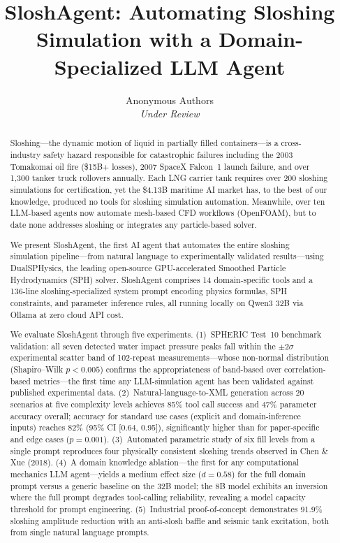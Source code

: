 \documentclass[11pt]{article}
\title{\textbf{SloshAgent: Automating Sloshing Simulation with a Domain-Specialized LLM Agent}}
\author{
  Anonymous Authors \\
  \textit{Under Review}
}
\date{}
\begin{document}
\maketitle

\begin{abstract}
Sloshing---the dynamic motion of liquid in partially filled containers---is a cross-industry safety hazard responsible for catastrophic failures including the 2003 Tomakomai oil fire (\$15B+ losses), 2007 SpaceX Falcon~1 launch failure, and over 1,300 tanker truck rollovers annually. Each LNG carrier tank requires over 200 sloshing simulations for certification, yet the \$4.13B maritime AI market has, to the best of our knowledge, produced no tools for sloshing simulation automation. Meanwhile, over ten LLM-based agents now automate mesh-based CFD workflows (OpenFOAM), but to date none addresses sloshing or integrates any particle-based solver.

We present SloshAgent, the first AI agent that automates the entire sloshing simulation pipeline---from natural language to experimentally validated results---using DualSPHysics, the leading open-source GPU-accelerated Smoothed Particle Hydrodynamics (SPH) solver. SloshAgent comprises 14 domain-specific tools and a 136-line sloshing-specialized system prompt encoding physics formulas, SPH constraints, and parameter inference rules, all running locally on Qwen3 32B via Ollama at zero cloud API cost.

We evaluate SloshAgent through five experiments. (1)~SPHERIC Test~10 benchmark validation: all seven detected water impact pressure peaks fall within the $\pm 2\sigma$ experimental scatter band of 102-repeat measurements---whose non-normal distribution (Shapiro--Wilk $p < 0.005$) confirms the appropriateness of band-based over correlation-based metrics---the first time any LLM-simulation agent has been validated against published experimental data. (2)~Natural-language-to-XML generation across 20 scenarios at five complexity levels achieves 85\% tool call success and 47\% parameter accuracy overall; accuracy for standard use cases (explicit and domain-inference inputs) reaches 82\% (95\% CI [0.64, 0.95]), significantly higher than for paper-specific and edge cases ($p = 0.001$). (3)~Automated parametric study of six fill levels from a single prompt reproduces four physically consistent sloshing trends observed in Chen \& Xue (2018). (4)~A domain knowledge ablation---the first for any computational mechanics LLM agent---yields a medium effect size ($d = 0.58$) for the full domain prompt versus a generic baseline on the 32B model; the 8B model exhibits an inversion where the full prompt degrades tool-calling reliability, revealing a model capacity threshold for prompt engineering. (5)~Industrial proof-of-concept demonstrates 91.9\% sloshing amplitude reduction with an anti-slosh baffle and seismic tank excitation, both from single natural language prompts.
\end{abstract}
\end{document}
